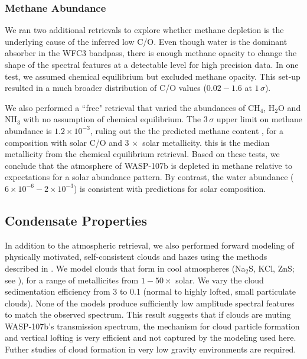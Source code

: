 \documentclass[twocolumn, trackchanges]{aastex61}
\begin{document}
\subsubsection{Methane Abundance}
We ran two additional retrievals to explore whether methane depletion is the underlying cause of the inferred low C/O.  Even though water is the dominant absorber in the WFC3 bandpass, there is enough methane opacity to change the shape of the spectral features at a detectable level for high precision data.  In one test, we assumed chemical equilibrium but excluded methane opacity. This set-up resulted in a much broader distribution of C/O values ($0.02 - 1.6$ at $1\,\sigma$). 

We also performed a ``free" retrieval that varied the abundances of CH$_4$, H$_2$O and NH$_3$ with no assumption of chemical equilibrium. The $3\,\sigma$ upper limit on methane abundance is $1.2\times10^{-3}$, ruling out the the predicted  methane content , for a composition with solar C/O and $3\,\times$ solar metallicity.  this is the median metallicity from the chemical equilibrium retrieval.  Based on these tests, we conclude that the atmosphere of WASP-107b is depleted in methane relative to expectations for a solar abundance pattern. By contrast, the water abundance ($6\times10^{-6} - 2\times10^{-3}$) is consistent with predictions for solar composition.

\subsection{Condensate Properties}
In addition to the atmospheric retrieval, we also performed forward modeling of physically motivated, self-consistent clouds and hazes using the methods described in \cite{fortney08, morley15}.  We model clouds that form in cool atmospheres (Na$_2$S, KCl, ZnS; see \citealt{morley12}), for a range of metallicites from $1-50\times$ solar. We vary the cloud sedimentation efficiency from 3 to 0.1 (normal to highly lofted, small particulate clouds). None of the models produce sufficiently low amplitude spectral features to match the observed spectrum.  This result suggests that if clouds are muting WASP-107b's transmission spectrum, the mechanism for cloud particle formation and vertical lofting is very efficient and not captured by the modeling used here. Futher studies of cloud formation in very low gravity environments are required.  
\end{document}
